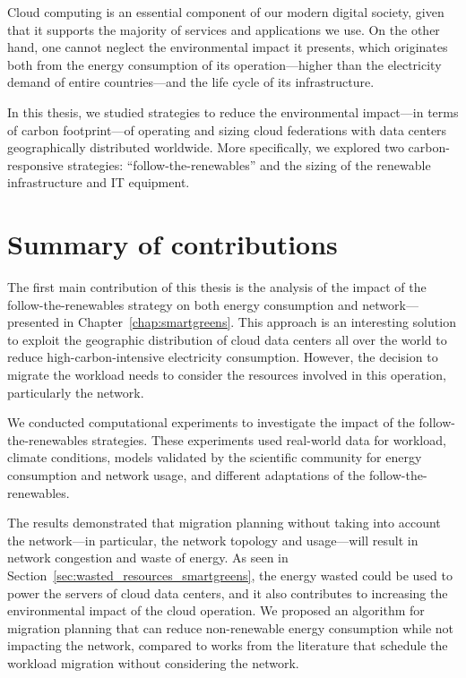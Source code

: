 Cloud computing is an essential component of our modern digital society, given that it supports the majority of services and applications we use. On the other hand, one cannot neglect the environmental impact it presents, which originates both from the energy consumption of its operation---higher than the electricity demand of entire countries---and the life cycle of its infrastructure.

In this thesis, we studied strategies to reduce the environmental impact---in terms of carbon footprint---of operating and sizing cloud federations with data centers geographically distributed worldwide. More specifically, we explored two carbon-responsive strategies: ``follow-the-renewables'' and the sizing of the renewable infrastructure and IT equipment.

\section{Summary of contributions }

\label{sec:conclusion_summary}

The first main contribution of this thesis is the analysis of the impact of the follow-the-renewables strategy on both energy consumption and network---presented in Chapter~\ref{chap:smartgreens}. This approach is an interesting solution to exploit the geographic distribution of cloud data centers all over the world to reduce high-carbon-intensive electricity consumption. However, the decision to migrate the workload needs to consider the resources involved in this operation, particularly the network. 

We conducted computational experiments to investigate the impact of the follow-the-renewables strategies. These experiments used real-world data for workload, climate conditions, models validated by the scientific community for energy consumption and network usage, and different adaptations of the follow-the-renewables. 

The results demonstrated that migration planning without taking into account the network---in particular, the network topology and usage---will result in network congestion and waste of energy. As seen in Section~\ref{sec:wasted_resources_smartgreens}, the energy wasted could be used to power the servers of cloud data centers, and it also contributes to increasing the environmental impact of the cloud operation. We proposed an algorithm for migration planning that can reduce non-renewable energy consumption while not impacting the network, compared to works from the literature that schedule the workload migration without considering the network.

